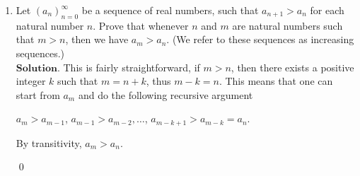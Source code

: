 \documentclass{article}
\theoremstyle{remark}
\begin{document}
\begin{enumerate}
            (f) 
            Using part (e) and part (b) the result follows, as we multiply $(a_n)$ by $(b_n^{-1})$.

            (g)
            Without loss of generality assume that $x \geq y$. Since $(a_n)$ converges to $x$ and $(b_n)$ converges to $y$,
            we can ask when does $(a_n)$ becomes ``larger'' than $(b_n)$.
            
            This is, we claim that for some $N \geq m$, for any $n \geq N$: $a_n \geq b_n$.
            To prove this claim, let $\varepsilon := (x-y)/2$, we know that there must exist some $N_{\varepsilon}, M_{\varepsilon} \geq m$ such that for any 
            $n \geq N_{\varepsilon}$
            \begin{center}
                $\displaystyle \vert a_n - x \vert \leq (x-y)/2$ and $\vert b_n - y\vert \leq (x-y)/2$
            \end{center}
            Hence,
            \begin{center}
                $b_n \leq (x-y)/2 + y = (x+y)/2$ and $(y-x)/2 + x = (x+y)/2\leq a_n$.
            \end{center}
            So the second implies inequality implies that $a_n \geq b_n$ for any $n \geq K := \max(N_\varepsilon, M_{\varepsilon})$.
            This means that $\lim_{n\to\infty}a_n \geq \lim_{n\to\infty}b_n$, so since starting from $K$, $\max(a_n,b_n) = a_n$,
            we conclude that 
            \begin{center}
                $\displaystyle \lim_{n\to\infty}\max(a_n,b_n) = \lim_{n\to\infty}a_{n+K} = x = \max(x,y)$ (last thing being by construction).
            \end{center}
            
            (h) Analogous proof as item (g), in fact one implies the other, since we can see what happens to the minimum in the same proof.
            \begin{flushright}
                \qed
            \end{flushright}
            \item Let \( (a_n)_{n=0}^{\infty} \) be a sequence of real numbers, such that \( a_{n+1} > a_n \) for each natural number \( n \). Prove that whenever \( n \) and \( m \) are natural numbers such that \( m > n \), then we have \( a_m > a_n \). (We refer to these sequences as increasing sequences.)\\
            $\textbf{Solution.}$
            This is fairly straightforward, if $m > n$, then there exists a positive integer $k$ such that 
            $m = n + k$, thus $m - k = n$. This means that one can start from $a_m$ and do the following recursive argument 
            \begin{center}
                $\displaystyle a_m > a_{m-1}$, $a_{m-1} > a_{m-2}, \dots$, $a_{m-k+1} > a_{m-k} = a_{n}$. 
            \end{center}
            By transitivity, $a_m > a_n$.
            \begin{flushright}
                \qed
            \end{flushright}


\end{enumerate}
\end{document}
